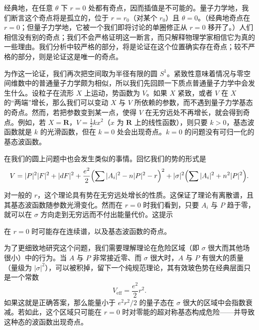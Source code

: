 经典地，在任意 $\theta$ 下 $r=0$ 处都有奇点，因而插值是不可能的。量子力学地，我们断言这个奇点将是孤立的，位于 $r=r_0$（对某个 $r_0$）且 $\theta=0$。（经典地奇点在 $r=0$；但量子力学地，它被一个我们即将讨论的单圈修正从 $r=0$ 移开了。）人们相信没有别的奇点；我们不会严格证明这一断言，而只解释物理学家相信它为真的一些理由。我们分析中较严格的部分，将是论证在这个位置确实存在奇点；较不严格的部分，则是论证这是唯一的奇点。

为作这一论证，我们再次把空间取为半径有限的圆 $S^{1}$。紧致性意味着情况与零空间维数中的普通量子力学颇为相似，所以我们先回顾一下质点普通量子力学中会发生什么。设粒子在流形 $X$ 上运动，势函数为 $V$。如果 $X$ 紧致，或者 $V$ 在 $X$ 的“两端”增长，那么我们可以变动 $X$ 与 $V$ 所依赖的参数，而不遇到量子力学基态的奇点。然而，若把参数变到某一点，使得 $V$ 在无穷远处不再增长，就会得到奇点。例如，若 $X=\mathbf{R}$，$V=\frac12 kx^{2}$（$x$ 为 $\mathbf{R}$ 上的线性函数），则只要 $k>0$，基态波函数就是 $k$ 的光滑函数，但在 $k=0$ 处会出现奇点。$k=0$ 的问题没有可归一化的基态波函数。

在我们的圆上问题中也会发生类似的事情。回忆我们的势的形式是
\[
  V=|P|^{2}|F|^{2}+|dF|^{2}
  +\frac{e^{2}}{2}\Bigl(\sum|A_i|^{2}-n|P|^{2}-r\Bigr)^{2}
  +|\sigma|^{2}\Bigl(\sum|A_i|^{2}+n^{2}|P|^{2}\Bigr).
\]


对一般的 $r$，这个理论具有势在无穷远处增长的性质。这保证了理论有离散谱，且其基态波函数随参数光滑变化。然而在 $r=0$ 时我们看到，只要 $A_i$ 与 $P$ 趋于零，就可以在 $\sigma$ 方向走到无穷远而不付出能量代价。这提示

在 $r=0$ 时可能存在连续谱，以及基态波函数的奇点。

为了更细致地研究这个问题，我们需要理解理论在危险区域（即 $\sigma$ 很大而其他场很小）中的行为。当 $A$ 与 $P$ 非常接近零、而 $\sigma$ 很大时，$A$ 与 $P$ 有很大的质量（量级为 $|\sigma|^{2}$），可以被积掉，留下一个纯规范理论，其有效玻色势在经典层面只是一个常数
\begin{equation}
  \tag{13.6}
  \label{eq:13-6}
  V_{\mathrm{eff}}=\frac{e^{2}}{2}r^{2}.
\end{equation}
如果这就是正确答案，那么能量小于 $e^{2}r^{2}/2$ 的量子态在 $\sigma$ 很大的区域中会指数衰减。若如此，这个区域只可能在 $r=0$ 时对零能的超对称基态构成危险——并导致这种态的波函数出现奇点。

